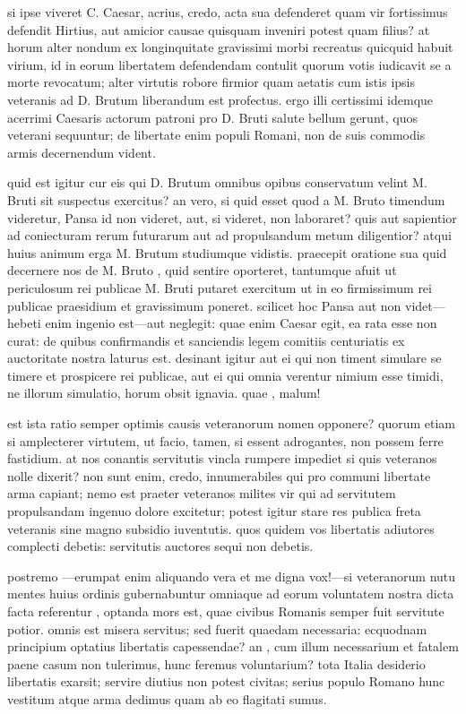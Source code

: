 si ipse viveret C. Caesar, acrius, credo, acta sua defenderet quam vir fortissimus defendit Hirtius, aut amicior causae quisquam inveniri potest quam filius? at horum alter nondum ex longinquitate gravissimi morbi recreatus quicquid habuit virium, id in eorum libertatem defendendam contulit quorum votis iudicavit se a morte revocatum; alter virtutis robore firmior quam aetatis cum istis ipsis veteranis ad D. Brutum liberandum est profectus. ergo illi certissimi idemque acerrimi Caesaris actorum patroni pro D. Bruti salute bellum gerunt, quos veterani sequuntur; de libertate enim populi Romani, non de suis commodis armis decernendum vident.

 quid est igitur cur eis qui D. Brutum omnibus opibus conservatum velint M. Bruti sit suspectus exercitus? an vero, si quid esset quod a M. Bruto timendum videretur, Pansa id non videret, aut, si videret, non laboraret? quis aut sapientior ad coniecturam rerum futurarum aut ad propulsandum metum diligentior? atqui huius animum erga M. Brutum studiumque vidistis. praecepit oratione sua quid decernere nos de M. Bruto , quid sentire oporteret, tantumque afuit ut periculosum rei publicae M. Bruti putaret exercitum ut in eo firmissimum rei publicae praesidium et gravissimum poneret. scilicet hoc Pansa aut non videt—hebeti enim ingenio est—aut neglegit: quae enim Caesar egit, ea rata esse non curat: de quibus confirmandis et sanciendis legem comitiis centuriatis ex auctoritate nostra laturus est. desinant igitur aut ei qui non timent simulare se timere et prospicere rei publicae, aut ei qui omnia verentur nimium esse timidi, ne illorum simulatio, horum obsit ignavia. quae , malum!

 est ista ratio semper optimis causis veteranorum nomen opponere? quorum etiam si amplecterer virtutem, ut facio, tamen, si essent adrogantes, non possem ferre fastidium. at nos conantis servitutis vincla rumpere impediet si quis veteranos nolle dixerit? non sunt enim, credo, innumerabiles qui pro communi libertate arma capiant; nemo est praeter veteranos milites vir qui ad servitutem propulsandam ingenuo dolore excitetur; potest igitur stare res publica freta veteranis sine magno subsidio iuventutis. quos quidem vos libertatis adiutores complecti debetis: servitutis auctores sequi non debetis.

 postremo —erumpat enim aliquando vera et me digna vox!—si veteranorum nutu mentes huius ordinis gubernabuntur omniaque ad eorum voluntatem nostra dicta facta referentur , optanda mors est, quae civibus Romanis semper fuit servitute potior. omnis est misera servitus; sed fuerit quaedam necessaria: ecquodnam principium optatius libertatis capessendae? an , cum illum necessarium et fatalem paene casum non tulerimus, hunc feremus voluntarium? tota Italia desiderio libertatis exarsit; servire diutius non potest civitas; serius populo Romano hunc vestitum atque arma dedimus quam ab eo flagitati sumus.

